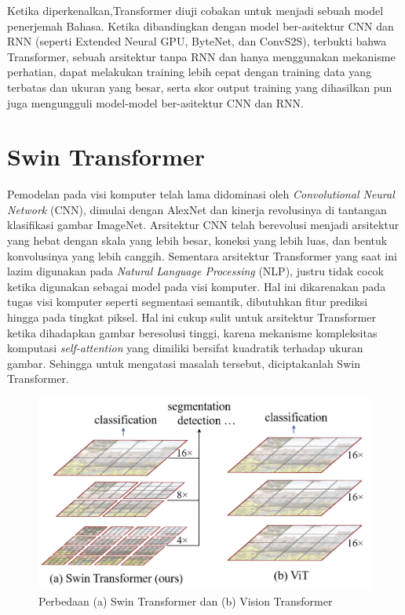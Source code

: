 Ketika diperkenalkan,Transformer diuji cobakan untuk menjadi sebuah model penerjemah Bahasa. Ketika dibandingkan dengan model ber-asitektur CNN dan RNN 
(seperti Extended Neural GPU, ByteNet, dan ConvS2S), terbukti bahwa Transformer, sebuah arsitektur tanpa RNN dan hanya menggunakan mekanisme perhatian, dapat 
melakukan training lebih cepat dengan training data yang terbatas dan ukuran yang besar, serta skor output training yang dihasilkan pun juga mengungguli model-model 
ber-asitektur CNN dan RNN. \parencite{Vaswani2017}

\section{Swin Transformer}
\label{sec:swintransformer}

Pemodelan pada visi komputer telah lama didominasi oleh \emph{Convolutional Neural Network} (CNN), dimulai dengan AlexNet dan kinerja revolusinya di tantangan 
klasifikasi gambar ImageNet. Arsitektur CNN telah berevolusi menjadi arsitektur yang hebat dengan skala yang lebih besar, koneksi yang lebih luas, dan bentuk 
konvolusinya yang lebih canggih. Sementara arsitektur Transformer yang saat ini lazim digunakan pada \emph{Natural Language Processing} (NLP), justru tidak cocok 
ketika digunakan sebagai model pada visi komputer. Hal ini dikarenakan pada tugas visi komputer seperti segmentasi semantik, dibutuhkan fitur prediksi hingga pada 
tingkat piksel. Hal ini cukup sulit untuk arsitektur Transformer ketika dihadapkan gambar beresolusi tinggi, karena mekanisme kompleksitas komputasi \emph{self-attention} 
yang dimiliki bersifat kuadratik terhadap ukuran gambar. Sehingga untuk mengatasi masalah tersebut, diciptakanlah Swin Transformer. \parencite{Liu2021}

\begin{figure}[ht]
  \centering
  \includegraphics[scale=0.5]{gambar/Perbedaan Swin dan VIT.png}
  \caption{Perbedaan (a)  Swin Transformer dan (b) Vision Transformer}
  \label{fig:perbedaanswintransformerdanvisiontransformer}
\end{figure}

